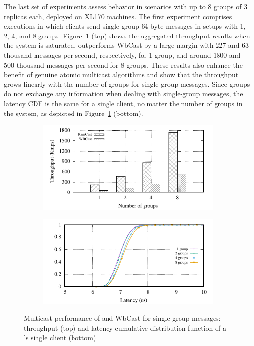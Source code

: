 The last set of experiments assess \libname behavior in scenarios with up to 8 groups of 3 replicas each, deployed on XL170 machines.
The first experiment comprises executions in which clients send single-group 64-byte messages in setups with 1, 2, 4, and 8 groups.
Figure~\ref{fig:multicast-single-group} (top) shows the aggregated throughput results when the system is saturated. 
\libname outperforms WbCast by a large margin with 227  and 63 thousand messages per second, respectively, for 1 group, and around 1800 and 500 thousand messages per second for 8 groups.
These results also enhance the benefit of genuine atomic multicast algorithms and show that the throughput grows linearly with the number of groups for single-group messages. 
Since groups do not exchange any information when dealing with single-group messages, the latency CDF is the same for a single client, no matter the number of groups in the system, as depicted in Figure~\ref{fig:multicast-single-group} (bottom).

\begin{figure}[htp!]
  \begin{subfigure}{\columnwidth}
    \advance\leftskip-0.25cm
    \includegraphics[width=1.01\columnwidth]{figures/benchmark/graphs/figure-genuine-compare-throughput}
  \end{subfigure}
  \begin{subfigure}{\columnwidth}
    \centering
    \includegraphics[width=0.95\columnwidth]{figures/benchmark/graphs/figure-genuine-compare-latency-cdf}
  \end{subfigure}
  \caption{Multicast performance of \libname and WbCast for single group messages: throughput (top) and latency cumulative distribution function of a \libname's single client (bottom)}
  \label{fig:multicast-single-group}
\end{figure}

